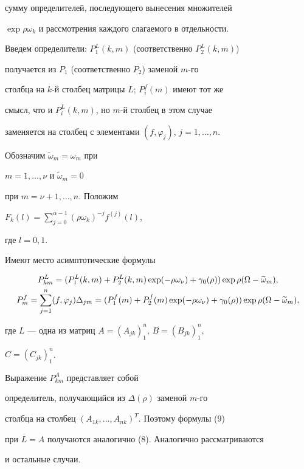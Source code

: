 сумму определителей, последующего вынесения множителей


$\exp\rho\omega_k$ и рассмотрения каждого слагаемого в отдельности.





Введем определители: $P_1^L(k,m)$ (соответственно $P_2^L(k,m)$)


получается из $P_1$ (соответственно $P_2$) заменой $m$-го


столбца на $k$-й столбец матрицы $L$; $P_i^f(m)$ имеют тот же


смысл, что и $P_i^L(k,m)$, но $m$-й столбец в этом случае


заменяется на столбец с элементами $(f,\varphi_j)$, $j=1,\dotsc,n$.


Обозначим $\widetilde\omega_m=\omega_m$ при


$m=1,\dotsc,\nu$ и $\widetilde\omega_m=0$


при $m=\nu+1,\dotsc,n$. Положим


$F_k(l)=\sum\limits_{j=0}^{\alpha-1}(\rho\omega_k)^{-j}f^{(j)}(l)$,


где $l=0,1$.





\begin{lem}


Имеют место асимптотические формулы


\begin{gather}


P_{km}^L=(P_1^L(k,m)+P_2^L(k,m)\exp(-\rho\omega_\nu)+\gamma_0


(\rho))\exp\rho(\Omega-\widetilde\omega_m), \\


%


P_m^f=\sum\limits_{j=1}^n(f,\varphi_j)\Delta_{jm}=(P_1^f(m)+P_2^f


(m)\exp(-\rho\omega_\nu)+\gamma_0(\rho))\exp\rho(\Omega-\widetilde


\omega_m),\notag


\end{gather}


где $L$ --- одна из матриц $A=(A_{jk})_1^n$, $B=(B_{jk})_1^n$,


$C=(C_{jk})_1^n$.


\end{lem}





\begin{pf}


Выражение $P_{km}^A$ представляет собой


определитель, получающийся из $\Delta(\rho)$ заменой $m$-го


столбца на столбец $(A_{1k},\dotsc,A_{nk})^T$. Поэтому формулы (9)


при $L=A$ получаются аналогично (8). Аналогично рассматриваются


и остальные случаи.


\end{pf}





